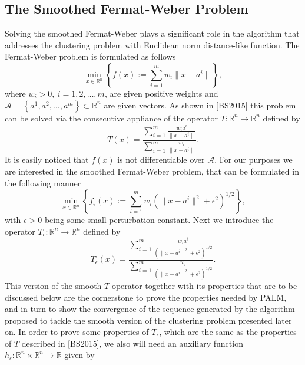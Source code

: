 \documentclass[11pt]{article}
\numberwithin{equation}{section}
\begin{document}
\subsection{The Smoothed Fermat-Weber Problem}
Solving the smoothed Fermat-Weber plays a significant role in the algorithm that addresses the clustering problem with Euclidean norm distance-like function.
The Fermat-Weber problem is formulated as follows
\begin{equation}
	\min_{x \in \mathbb{R}^n} \left\lbrace f(x) := \sum\limits_{i=1}^{m} w_i\|x - a^i\| \right\rbrace , \label{StateEq60}
\end{equation}
where $w_i>0, \: i=1,2, \ldots, m$, are given positive weights and $\mathcal{A} = \left\lbrace a^1, a^2, \ldots, a^m \right\rbrace \subset \mathbb{R}^n$ are given vectors. As shown in [BS2015] this problem can be solved via the consecutive appliance of the operator $T: \mathbb{R}^n \rightarrow \mathbb{R}^n$ defined by
\begin{equation*}
	T(x) = \frac{\sum\limits_{i=1}^{m}\frac{w_i a^i}{\|x - a^i\|}}{\sum\limits_{i=1}^{m}\frac{w_i}{\|x - a^i\|}} .
\end{equation*}
It is easily noticed that $f(x)$ is not differentiable over $\mathcal{A}$.  For our purposes we are interested in the smoothed Fermat-Weber problem, that can be formulated in the following manner
\begin{equation}
	\min_{x \in \mathbb{R}^n} \left\lbrace f_{\epsilon}(x) := \sum\limits_{i=1}^{m} w_i \left( \|x - a^i\|^2 + {\epsilon}^2 \right)^{1/2} \right\rbrace , \label{StateEq61}
\end{equation}
with $\epsilon > 0$ being some small perturbation constant. Next we introduce the operator $T_{\epsilon}: \mathbb{R}^n \rightarrow \mathbb{R}^n$ defined by 
\begin{equation*}
	T_{\epsilon}(x) = \frac{\sum\limits_{i=1}^{m}\frac{w_i a^i}{\left( \|x - a^i\|^2 + {\epsilon}^2 \right)^{1/2}}}{\sum\limits_{i=1}^{m}\frac{w_i}{\left( \|x - a^i\|^2 + {\epsilon}^2 \right)^{1/2}}} .
\end{equation*}
This version of the smooth $T$ operator together with its properties that are to be discussed below are the cornerstone to prove the properties needed by PALM, and in turn to show the convergence of the sequence generated by the algorithm proposed to tackle the smooth version of the clustering problem presented later on.
In order to prove some properties of $T_{\epsilon}$, which are the same as the properties of $T$ described in [BS2015], we also will need an auxiliary function $h_{\epsilon}: \mathbb{R}^n \times \mathbb{R}^n \rightarrow \mathbb{R}$ given by
\end{document}
